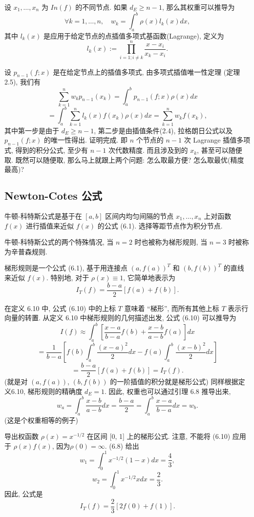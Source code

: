 \documentclass[a4paper]{ctexart}
\newcommand{\hl}[1]
{\noindent {\bf {#1}}}
\begin{document}
\hl{引理6.8} 设 $x_1, \ldots, x_n$ 为 $In(f)$ 的不同节点. 如果 $d_E \geq n - 1$, 
那么其权重可以推导为
\[ 
\forall k = 1, \ldots, n, \quad w_k = \int_{a}^{b} \rho(x)l_k(x)dx, 
\]
其中 $l_k(x)$ 是应用于给定节点的点插值多项式基函数(Lagrange), 定义为
\[ 
l_k(x) := \prod_{i=1;i \neq k}^{n} \frac{x - x_i}{x_k - x_i}. 
\]

\hl{证明} 设 $p_{n-1}(f; x)$ 是在给定节点上的插值多项式, 由多项式插值唯一性定理 (定理2.5), 我们有
\[ 
\sum_{k = 1}^{n} w_k p_{n-1}(x_k) = \int_{a}^{b} p_{n-1}(f; x) \rho(x) dx 
\]
\[ 
= \int_{a}^{b} \sum_{k=1}^{n} l_k(x) f(x_k) \rho(x) dx = \sum_{k=1}^{n} w_k f(x_k), 
\]
其中第一步是由于 $d_E \geq n - 1$, 第二步是由插值条件(2.4), 拉格朗日公式以及 $p_{n-1}(f; x)$ 的唯一性得出. 
证明完成. 即 $n$ 个节点的 $n - 1$ 次 Lagrange 插值多项式, 得到的积分公式, 至少有 $n - 1$ 次代数精度. 
而且涉及到的 $x_k$, 甚至可以随便取. 既然可以随便取, 那么马上就跟上两个问题: 怎么取最方便? 怎么取最优(精度最高)? 

\subsection{Newton-Cotes 公式}

\hl{定义6.9} 牛顿-科特斯公式是基于在 $[a, b]$ 区间内均匀间隔的节点 
$x_1, \ldots, x_n$ 上对函数 $f(x)$ 进行插值来近似 $f(x)$ 的公式 (6.1).
选择等距节点作为积分节点. 

牛顿-科特斯公式的两个特殊情况, 当 $n = 2$ 时也被称为梯形规则, 当 $n = 3$ 时被称为辛普森规则.

\hl{定义6.10} 梯形规则是一个公式 (6.1), 基于用连接点 $(a, f(a))^T$ 和 $(b, f(b))^T$ 
的直线来近似 $f(x)$. 特别地, 对于 $\rho(x) \equiv 1$, 它简单地表示为
\[ 
I_T(f) = \frac{b - a}{2} [f(a) + f(b)]. 
\]

在定义 6.10 中, 公式 (6.10) 中的上标 $T$ 意味着 ``梯形'', 
而所有其他上标 $T$ 表示行向量的转置. 从定义 6.10 中梯形规则的几何描述出发, 公式 (6.10) 可以推导为
\[ 
I(f) \approx \int_{a}^{b} \left[ \frac{x - a}{b - a} f(b) + \frac{x - b}{a - b} f(a) \right] dx 
\]
\[ 
= \frac{1}{b - a} 
\left[ f(b) \int_{a}^{b} \frac{(x - a)^2}{2} dx - f(a) \int_{a}^{b} \frac{(x - b)^2}{2} dx \right] 
\]
\[ 
= \frac{b - a}{2} [f(a) + f(b)] = I_T(f). 
\]
(就是对 $(a, f(a))$, $(b, f(b))$ 的一阶插值的积分就是梯形公式)
同样根据定义6.10, 梯形规则的精确度 $d_E = 1$. 因此, 权重也可以通过引理 6.8 推导出来,
\[ 
w_a = \int_{a}^{b} \frac{x - b}{a - b} dx 
= \frac{b - a}{2} = \int_{a}^{b} \frac{x - a}{b - a} dx = w_b. 
\]
(这是个权重相等的例子)

\hl{例6.11} 导出权函数 $\rho(x) = x^{-1/2}$ 在区间 [0, 1]
上的梯形公式. 注意, 不能将 (6.10) 应用于 $\rho(x)f(x)$, 
因为$\rho(0) = \infty$. (6.8) 给出
\[ 
w_1 = \int_{0}^{1} x^{-1/2} (1 - x) dx = \frac{4}{3}, 
\]
\[ 
w_2 = \int_{0}^{1} x^{-1/2} x dx = \frac{2}{3}. 
\]
因此, 公式是
\[ 
I_T(f) = \frac{2}{3} [2f(0) + f(1)]. 
\] 
\end{document}
